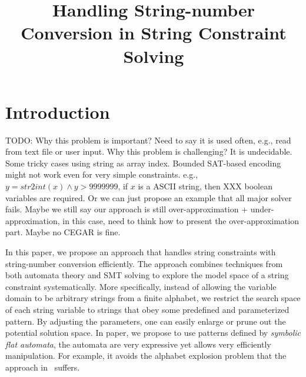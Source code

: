 \documentclass{llncs}
\title{Handling String-number Conversion in String Constraint Solving}
\author{}
\institute{}
\begin{document}
\newcommand{\hide}[1]{}

\newcommand{\todo}[1]{{\color{blue}TODO: #1}}
\newcommand{\sti}[1]{\mbox{\textbf{toInt}($#1$)}}
\newcommand{\its}[1]{\mbox{\textbf{toStr}($#1$)}}
\newcommand{\varn}{\mbox{$\mathbb{V}_n$}}
\newcommand{\vars}{\mbox{$\mathbb{V}_s$}}
\newcommand{\cvar}{\mbox{$\mathbb{X}$}}
\newcommand{\modelof}[1]{[\![#1]\!]}
\newcommand{\true}{\mbox{$\mathsf{true}$}}


\newcommand{\enc}[1]{Enc(#1)}
\newcommand{\ch}[1]{\mbox{`#1'}}
\maketitle


\section{Introduction} \label{section:introduction}

\todo{Why this problem is important? Need to say it is used often, e.g., read 
from text file or user input. Why this problem is challenging? It is undecidable. Some tricky cases 
using string as array index. Bounded SAT-based encoding might not work even for 
very simple constraints. e.g., $y=str2int(x) \wedge y>9999999$, if $x$ is a 
ASCII string, then XXX boolean variables are required. Or we can just propose 
an example that all major solver fails. Maybe we still say our approach is still over-approximation + under-approximation, in this case, need to think how to present the over-approximation part. Maybe no CEGAR is fine.}


In this paper, we propose an approach that handles string constraints with string-number conversion efficiently. The approach combines techniques from both automata theory and SMT solving to explore the model space of a string constraint systematically. More specifically, instead of allowing the variable domain to be arbitrary strings from a finite alphabet, we restrict the search space of each string variable to strings that obey some predefined and parameterized pattern. By adjusting the parameters, one can easily enlarge or prune out the potential solution space. In paper, we propose to use patterns defined by \emph{symbolic flat automata}, the automata are very expressive yet allows very efficiently manipulation. For example, it avoids the alphabet 
explosion problem that the approach in~\cite{PLDI2017} suffers.
\end{document}
